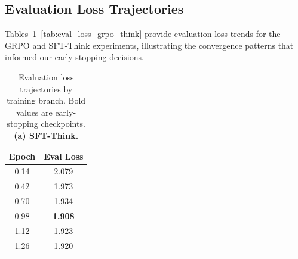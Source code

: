 \documentclass[11pt]{article}
\begin{document}
\begin{table}[!ht]
\centering
\caption{Training metrics across all HumorGen variants. (*) Training was terminated by early stopping at the best recorded eval loss.}
\label{tab:training_dynamics}
\end{table}

\subsection{Evaluation Loss Trajectories}
\label{sec:appendix_eval_loss}
Tables~\ref{tab:eval_loss_sft_think}--\ref{tab:eval_loss_grpo_think} provide evaluation loss trends for the GRPO and SFT-Think experiments, illustrating the convergence patterns that informed our early stopping decisions.

\begin{table}[!ht]
\centering
\scriptsize
\caption{Evaluation loss trajectories by training branch. Bold values are early-stopping checkpoints. \textbf{(a) SFT-Think.}}
\label{tab:eval_loss_sft_think}
\begin{tabular}{cc}
\toprule
\textbf{Epoch} & \textbf{Eval Loss} \\
\midrule
0.14 & 2.079 \\
0.42 & 1.973 \\
0.70 & 1.934 \\
0.98 & \textbf{1.908} \\
1.12 & 1.923 \\
1.26 & 1.920 \\
\bottomrule
\end{tabular}
\end{table}
\end{document}
